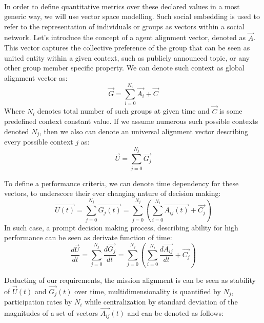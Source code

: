 \documentclass{article}
\begin{document}
\begin{CJK}{UTF8}{gbsn}
\begin{multicols}{2}
        \paragraph*{}
        In order to define quantitative metrics over these declared values in a most generic way, we will use vector space modelling. Such social embedding is used to refer to the representation of individuals or groups as vectors within a social network. Let's introduce the concept of a agent alignment vector, denoted as  $\vec{A}$. This vector captures the collective preference of the group that can be seen as united entity within a given context, such as publicly announced topic, or any other group member specific property. We can denote such context as global alignment vector as:
        \begin{equation}
            \label{eq:glob-align}
            \vec{G} = \sum_{i=0}^{N_{i}} \vec{A_i} + \vec{C}
        \end{equation} Where $N_i$ denotes total number of such groups at given time and $\vec{C}$ is some predefined context constant value.
        If we assume numerous such possible contexts denoted ${N_j}$, then we also can denote an universal alignment vector describing every possible context $j$ as:
        \begin{equation}
            \vec{U} = \sum_{j=0}^{N_{j}} \vec{G_j}
        \end{equation}

        To define a performance criteria, we can denote time dependency for these vectors, to underscore their ever changing nature of decision making:
        \begin{equation}
            \vec{U(t)} = \sum_{j=0}^{N_{j}} \vec{G_j(t)} = \sum_{j=0}^{N_{j}}(\sum_{i=0}^{N_{i}} \vec{A_{ij}(t)} + \vec{C_j})
        \end{equation}
        In such case, a prompt decision making process,  describing ability for high performance can be seen as derivate function of time:
        \begin{equation}
            \label{eq:speed-of-changes}
            \frac{d\vec{U}}{dt} = \sum_{j=0}^{N_{j}} \frac{d\vec{G_j}}{dt} = \sum_{j=0}^{N_{j}} (\sum_{i=0}^{N_{i}} \frac{d\vec{A_{ij}}}{dt} + \vec{C_j})
        \end{equation}

        Deducting of our requirements, the mission alignment is can be seen as stability of $\vec{U}(t)$ and $\vec{G_j}(t)$ over time, multidimensionality is quantified by ${N_j}$,  participation rates by $N_i$ while centralization by standard deviation of the magnitudes of a set of vectors $\vec{A_{ij}}(t)$ and can be denoted as follows:


\end{multicols}
\end{CJK}
\end{document}
